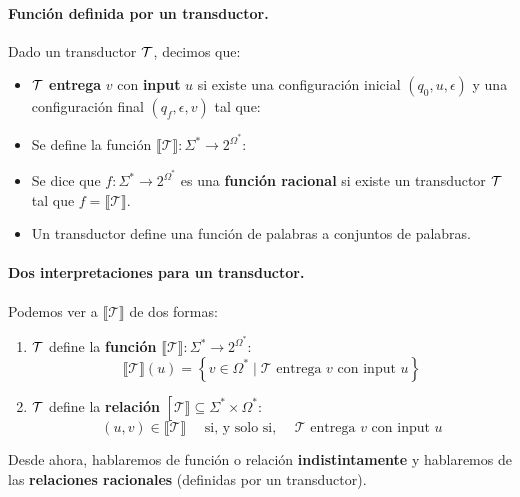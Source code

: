 \paragraph{Función definida por un transductor.} Dado un transductor $\mathcal{T}$, decimos que:
\begin{itemize}
    \item $\mathcal{T}$ \textbf{entrega} $v$ con \textbf{input} $u$ si existe una configuración inicial $(q_0, u, \epsilon)$ y una configuración final $(q_f, \epsilon, v)$ tal que:
    \item Se define la función $\llbracket \mathcal{T} \rrbracket: \Sigma^* \rightarrow 2^{\Omega^*}$:
    \item Se dice que $f: \Sigma^* \rightarrow 2^{\Omega^*}$ es una \textbf{función racional} si existe un transductor $\mathcal{T}$ tal que $f=\llbracket \mathcal{T} \rrbracket$.
    \item Un transductor define una función de palabras a conjuntos de palabras.
\end{itemize}

\paragraph{Dos interpretaciones para un transductor.} Podemos ver a $\llbracket \mathcal{T} \rrbracket$ de dos formas:
\begin{enumerate}
    \item $\mathcal{T}$ define la \textbf{función} $\llbracket \mathcal{T} \rrbracket: \Sigma^* \rightarrow 2^{\Omega^*}$:
          $$
              \llbracket \mathcal{T} \rrbracket(u)=\left\{v \in \Omega^* \mid \mathcal{T} \text { entrega } v \text { con input } u\right\}
          $$
    \item $\mathcal{T}$ define la \textbf{relación} $\left[\mathcal{T} \rrbracket \subseteq \Sigma^* \times \Omega^*\right.$:
          $$
              (u, v) \in \llbracket \mathcal{T} \rrbracket \quad \text { si, y solo si, } \quad \mathcal{T} \text { entrega } v \text { con input } u
          $$
\end{enumerate}

Desde ahora, hablaremos de función o relación \textbf{indistintamente} y hablaremos de las \textbf{relaciones racionales} (definidas por un transductor).

